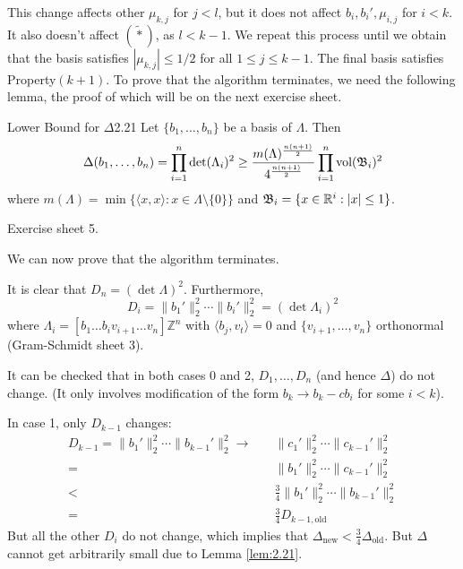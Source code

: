 \documentclass{Vorlesungstemplate_English} %
\begin{document}
\noindent This change affects other $\mu_{k,j}$ for $j < l$, but it does not affect $b_i, b_i', \mu_{i,j}$ for $i < k$. It also doesn't affect $(\widetilde{*})$, as $l < k-1$. We repeat this process until we obtain that the basis satisfies $|\mu_{k,j}| \le 1/2$ for all $1 \le j \le k-1$. The final basis satisfies Property$(k+1)$.
To prove that the algorithm terminates, we need the following lemma, the proof of which will be on the next exercise sheet.
\begin{lemma}{Lower Bound for $\Delta$}{2.21}
    Let $\{ b_1, \dots, b_n \}$ be a basis of $\Lambda$. Then
    \[ \Delta(b_1, \dots, b_n) = \prod_{i=1}^n \det(\Lambda_i)^2 \geq \frac{m(\Lambda)^{\frac{n(n+1)}{2}}}{4^{\frac{n(n+1)}{2}}}\prod_{i=1}^n \text{vol}(\mathfrak{B}_i)^2 \]
    where $m(\Lambda) = \min \{ \langle x, x \rangle : x \in \Lambda \setminus \{0\} \}$ and $\mathfrak{B}_i = \{ x \in \mathbb{R}^i: |x| \leq 1\}$.
\end{lemma}
\begin{pf}
    Exercise sheet 5.
\end{pf}
\noindent We can now prove that the algorithm terminates.
\begin{pf}
It is clear that $D_n = (\det \Lambda)^2$. Furthermore,
\[ D_i = \|b_1'\|_2^2 \cdots \|b_i'\|_2^2 = (\det \Lambda_i)^2 \]
where $\Lambda_i = [b_1 \dots b_i v_{i+1} \dots v_n] \mathbb{Z}^n$ with $\langle b_j, v_t \rangle = 0$ and $\{ v_{i+1}, \dots, v_n \}$ orthonormal (Gram-Schmidt sheet 3).

It can be checked that in both cases 0 and 2, $D_1, \dots, D_n$ (and hence $\Delta$) do not change. (It only involves modification of the form $b_k \to b_k - cb_i$ for some $i < k$).

In case 1, only $D_{k-1}$ changes:
\begin{align*} D_{k-1} = \|b_1'\|_2^2 \cdots \|b_{k-1}'\|_2^2 \to \quad & \|c_1'\|_2^2 \cdots \|c_{k-1}'\|_2^2 \\
= \quad & \|b_1'\|_2^2 \cdots \|c_{k-1}'\|_2^2 \\
< \quad & \frac{3}{4} \|b_1'\|_2^2 \cdots \|b_{k-1}'\|_2^2 \\
= \quad &\frac{3}{4} D_{k-1, \text{old}} \end{align*}
But all the other $D_i$ do not change, which implies that $\Delta_{\text{new}} < \frac{3}{4} \Delta_{\text{old}}$.
But $\Delta$ cannot get arbitrarily small due to Lemma \ref{lem:2.21}.
\end{pf}
\end{document}
